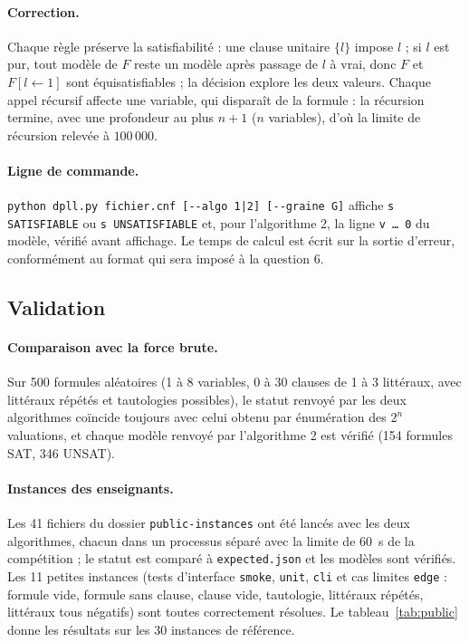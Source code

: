 \documentclass[11pt,a4paper]{article}
\begin{document}
\paragraph{Correction.} Chaque règle préserve la satisfiabilité : une clause unitaire $\{l\}$
impose $l$ ; si $l$ est pur, tout modèle de $F$ reste un modèle après passage de $l$ à vrai, donc
$F$ et $F[l\leftarrow1]$ sont équisatisfiables ; la décision explore les deux valeurs. Chaque
appel récursif affecte une variable, qui disparaît de la formule : la récursion termine, avec une
profondeur au plus $n+1$ ($n$ variables), d'où la limite de récursion relevée à $100\,000$.

\paragraph{Ligne de commande.} \texttt{python dpll.py fichier.cnf [-{}-algo 1|2] [-{}-graine G]}
affiche \texttt{s SATISFIABLE} ou \texttt{s UNSATISFIABLE} et, pour l'algorithme 2, la ligne
\texttt{v \dots\ 0} du modèle, vérifié avant affichage. Le temps de calcul est écrit sur la sortie
d'erreur, conformément au format qui sera imposé à la question 6.

\subsection{Validation}

\paragraph{Comparaison avec la force brute.} Sur 500 formules aléatoires (1 à 8 variables, 0 à 30
clauses de 1 à 3 littéraux, avec littéraux répétés et tautologies possibles), le statut renvoyé
par les deux algorithmes coïncide toujours avec celui obtenu par énumération des $2^n$ valuations,
et chaque modèle renvoyé par l'algorithme 2 est vérifié (154 formules SAT, 346 UNSAT).

\paragraph{Instances des enseignants.} Les 41 fichiers du dossier \texttt{public-instances}
ont été lancés avec les deux algorithmes, chacun dans un processus séparé avec la limite de
60~s de la compétition ; le statut est comparé à \texttt{expected.json} et les modèles sont
vérifiés. Les 11 petites instances (tests d'interface \texttt{smoke}, \texttt{unit},
\texttt{cli} et cas limites \texttt{edge} : formule vide, formule sans clause, clause vide,
tautologie, littéraux répétés, littéraux tous négatifs) sont toutes correctement résolues. Le
tableau~\ref{tab:public} donne les résultats sur les 30 instances de référence.
\end{document}
